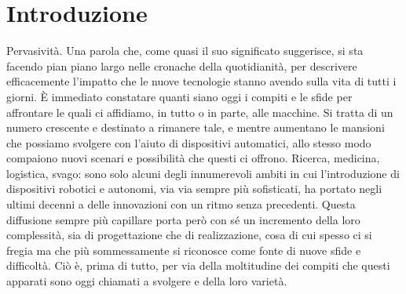 
\chapter[Introduzione]{Introduzione}
\label{chap:Chapter1}
\doublespacing
\fontsize{12}{12}\selectfont

\indent Pervasività. Una parola che, come quasi il suo significato suggerisce, si sta facendo pian piano largo nelle cronache della quotidianità, per descrivere efficacemente l'impatto che le nuove tecnologie stanno avendo sulla vita di tutti i giorni. È immediato constatare quanti siano oggi i compiti e le sfide per affrontare le quali ci affidiamo, in tutto o in parte, alle macchine. Si tratta di un numero crescente e destinato a rimanere tale, e mentre aumentano le mansioni che possiamo svolgere con l'aiuto di dispositivi automatici, allo stesso modo compaiono nuovi scenari e possibilità che questi ci offrono. Ricerca, medicina, logistica, svago: sono solo alcuni degli innumerevoli ambiti in cui l'introduzione di dispositivi robotici e autonomi, via via sempre più sofisticati, ha portato negli ultimi decenni a delle innovazioni con un ritmo senza precedenti. Questa diffusione sempre più capillare porta però con sé un incremento della loro complessità, sia di progettazione che di realizzazione, cosa di cui spesso ci si fregia ma che più sommessamente si riconosce come fonte di nuove sfide e difficoltà. Ciò è, prima di tutto, per via della moltitudine dei compiti che questi apparati sono oggi chiamati a svolgere e della loro varietà.\\
